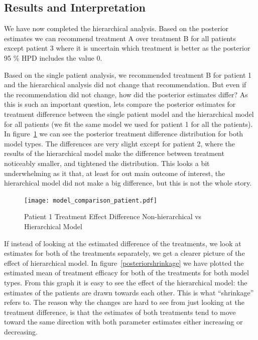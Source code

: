 \documentclass[12pt,a4paper,leqno]{report}
\theoremstyle{plain}
\theoremstyle{definition}
\theoremstyle{remark}
\begin{document}
\subsection{Results and Interpretation}

We have now completed the hierarchical analysis. Based on the posterior estimates we can
recommend treatment A over treatment B for all patients except patient 3 where it is
uncertain which treatment is better as the posterior 95 \% HPD includes the value 0.

Based on the single patient analysis, we recommended treatment B for patient 1 and the
hierarchical analysis did not change that recommendation. But even if the recommendation
did not change, how did the posterior estimates differ? As this is such an important
question, lets compare the posterior estimates for treatment difference between the
single patient model and the hierarchical model for all patients (we fit the same model
we used for patient 1 for all the patients). In figure\ \ref{modelcomparisonpatient} we
can see the posterior treatment difference distribution for both model types. The
differences are very slight
except for patient 2, where the results of the hierarchical model make the difference
between treatment noticeably smaller, and tightened the distribution. This looks a bit
underwhelming as it that, at least for out main outcome of interest, the hierarchical model did not make a
big difference, but this is not the whole story.

\bigskip
\begin{figure}[H]
    \caption{Patient 1 Treatment Effect Difference Non-hierarchical vs Hierarchical Model}\label{modelcomparisonpatient}
    \bigskip
    \texttt{[image: model\_comparison\_patient.pdf]}
\end{figure}
\bigskip

If instead of looking at the estimated difference of the treatments, we look at estimates
for both of the treatments separately, we get a clearer picture of the effect of
hierarchical model. In figure\ \ref{posteriorshrinkage} we have plotted the estimated mean of
treatment efficacy for both of the treatments for both model types. From this graph it is
easy to see the effect of the hierarchical model: the estimates of the patients are drawn
towards each other. This is what ``shrinkage'' refers to. The reason why the changes are
hard to see from just looking at the treatment difference, is that the estimates of both
treatments tend to move toward the same direction with both parameter estimates either
increasing or decreasing.
\end{document}
